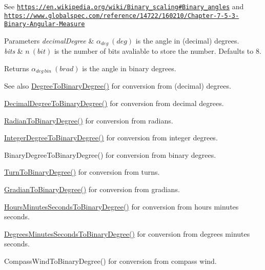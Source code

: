 See \href{https://en.wikipedia.org/wiki/Binary_scaling#Binary_angles}{\tt https\+://en.\+wikipedia.\+org/wiki/\+Binary\+\_\+scaling\#\+Binary\+\_\+angles} and \href{https://www.globalspec.com/reference/14722/160210/Chapter-7-5-3-Binary-Angular-Measure}{\tt https\+://www.\+globalspec.\+com/reference/14722/160210/\+Chapter-\/7-\/5-\/3-\/\+Binary-\/\+Angular-\/\+Measure} 
\begin{DoxyParams}{Parameters}
{\em decimal\+Degree} & $\alpha_{deg}\ (deg)$ is the angle in (decimal) degrees. \\
\hline
{\em bits} & $n\ (bit)$ is the number of bits avaliable to store the number. Defaults to 8. \\
\hline
\end{DoxyParams}
\begin{DoxyReturn}{Returns}
$\alpha_{deg\ bin}\ (brad)$ is the angle in binary degrees. 
\end{DoxyReturn}
\begin{DoxySeeAlso}{See also}
\mbox{\hyperlink{group___e_g_x_math-_conversions-_angle_conversions-_degree_gacd1e3dc5194e89426a899a7cac4874f8}{Degree\+To\+Binary\+Degree()}} for conversion from (decimal) degrees. 

\mbox{\hyperlink{group___e_g_x_math-_conversions-_angle_conversions-_decimal_degree_gaceec7ae7988c7f342d0b0fa6940720a1}{Decimal\+Degree\+To\+Binary\+Degree()}} for conversion from decimal degrees. 

\mbox{\hyperlink{group___e_g_x_math-_conversions-_angle_conversions-_radian_ga13311d9b6977d514f1d6c336e7c0162b}{Radian\+To\+Binary\+Degree()}} for conversion from radians. 

\mbox{\hyperlink{group___e_g_x_math-_conversions-_angle_conversions-_integer_degree_ga694bbfe624c3c14e97ce6155ca9bc44d}{Integer\+Degree\+To\+Binary\+Degree()}} for conversion from integer degrees. 

Binary\+Degree\+To\+Binary\+Degree() for conversion from binary degrees. 

\mbox{\hyperlink{group___e_g_x_math-_conversions-_angle_conversions-_turn_ga678efb8f5c3958351fc3f1dfaf117b28}{Turn\+To\+Binary\+Degree()}} for conversion from turns. 

\mbox{\hyperlink{group___e_g_x_math-_conversions-_angle_conversions-_gradian_ga6bf31920148bfd61f1f06eb961c3f62b}{Gradian\+To\+Binary\+Degree()}} for conversion from gradians. 

\mbox{\hyperlink{group___e_g_x_math-_conversions-_angle_conversions-_hours_minutes_seconds_ga962a367fd21f0047eb0a7116a59c2bfc}{Hours\+Minutes\+Seconds\+To\+Binary\+Degree()}} for conversion from hours minutes seconds. 

\mbox{\hyperlink{group___e_g_x_math-_conversions-_angle_conversions-_degrees_minutes_seconds_ga838c47916ce872cab2dfecd5ccf0a6ee}{Degrees\+Minutes\+Seconds\+To\+Binary\+Degree()}} for conversion from degrees minutes seconds. 

Compass\+Wind\+To\+Binary\+Degree() for conversion from compass wind. 
\end{DoxySeeAlso}
